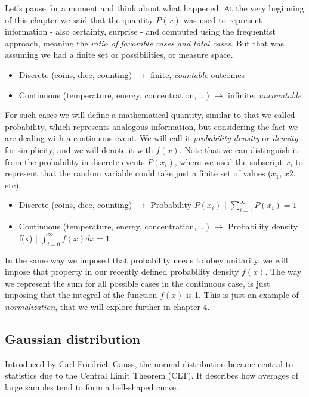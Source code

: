 \documentclass{book}
\begin{document}
Let's pause for a moment and think about what happened. At the very beginning of this chapter we said that the quantity $P(x)$ was used to represent information - also certainty, surprise - and computed using the frequentist approach, meaning the \textit{ratio of favorable cases and total cases}. But that was assuming we had a finite set or possibilities, or measure space.

\begin{itemize}
\item Discrete (coins, dice, counting) $\longrightarrow$ finite, \textit{countable} outcomes
\item Continuous (temperature, energy, concentration, ...) $\longrightarrow$ infinite, \textit{uncountable}
\end{itemize}

For such cases we will define a mathematical quantity, similar to that we called probability, which represents analogous information, but considering the fact we are dealing with a continuous event. We will call it \textit{probability density} or \textit{density} for simplicity, and we will denote it with $f(x)$. Note that we can distinguish it from the probability in discrete events $P(x_{i})$, where we used the subscript $x_{i}$ to represent that the random variable could take just a finite set of values ($x_{1}$, $x{2}$, etc).

\begin{itemize}
\item Discrete (coins, dice, counting) $\longrightarrow$ Probability $P(x_{i})$ | $\sum_{i = 1}^{\infty} P(x_{i}) = 1$
\item Continuous (temperature, energy, concentration, ...) $\longrightarrow$ Probability density f(x) | $\int_{i = 0}^{\infty} f(x) dx = 1$
\end{itemize}

In the same way we imposed that probability needs to obey unitarity, we will impose that property in our recently defined probability density $f(x)$. The way we represent the sum for all possible cases in the continuous case, is just imposing that the integral of the function $f(x)$ is 1. This is just an example of \textit{normalization}, that we will explore further in chapter 4.

\newpage
\subsection{Gaussian distribution}
Introduced by Carl Friedrich Gauss, the normal distribution became central to statistics due to the Central Limit Theorem (CLT). It describes how averages of large samples tend to form a bell-shaped curve.
\end{document}
